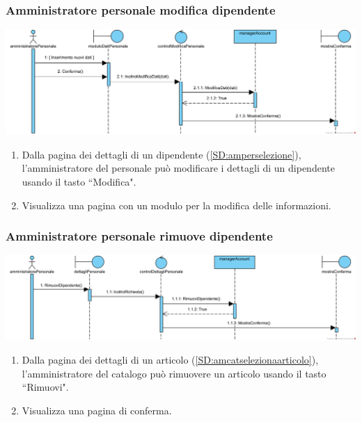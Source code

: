 \documentclass[12pt]{article}
\begin{document}
\subsubsection{Amministratore personale modifica dipendente}
\label{SD:ampermodifica}
\begin{center}
\includegraphics[width=\textwidth]{SequenceDiagram/AmministratorePersonaleDipendenteModifica}
\end{center}

\begin{enumerate}
\item Dalla pagina dei dettagli di un dipendente (\ref{SD:amperselezione}), l'amministratore del personale può modificare i dettagli di un dipendente usando il tasto ``Modifica".
\item Visualizza una pagina con un modulo per la modifica delle informazioni.
\end{enumerate}

\subsubsection{Amministratore personale rimuove dipendente}
\label{SD:amperrimuove}
\begin{center}
\includegraphics[width=\textwidth]{SequenceDiagram/AmministratorePersonaleDipendenteRimuove}
\end{center}


\begin{enumerate}
\item Dalla pagina dei dettagli di un articolo (\ref{SD:amcatselezionaarticolo}), l'amministratore del catalogo può rimuovere un articolo usando il tasto ``Rimuovi".
\item Visualizza una pagina di conferma.
\end{enumerate}
\end{document}

